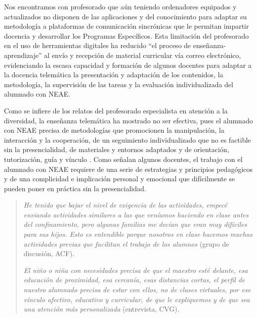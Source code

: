 \documentclass{textolivre}
\begin{document}
Nos encontramos con profesorado que aún teniendo ordenadores equipados y actualizados no disponen de las aplicaciones y del conocimiento para adaptar su metodología a plataformas de comunicación sincrónicas que le permitan impartir docencia y desarrollar los Programas Específicos. Esta limitación del profesorado en el uso de herramientas digitales ha reducido “el proceso de enseñanza-aprendizaje” al envío y recepción de material curricular vía correo electrónico, evidenciando la escasa capacidad y formación de algunos docentes para adaptar a la docencia telemática la presentación y adaptación de los contenidos, la metodología, la supervisión de las tareas y la evaluación individualizada del alumnado con NEAE.

Como se infiere de los relatos del profesorado especialista en atención a la diversidad, la enseñanza telemática ha mostrado no ser efectiva, pues el alumnado con NEAE precisa de metodologías que promocionen la manipulación, la interacción y la cooperación, de un seguimiento individualizado que no es factible sin la presencialidad, de materiales y entornos adaptados \cite{rogero2020} %
y de orientación, tutorización, guía y vínculo \cite{munoz2020}. %
Como señalan algunos docentes, el trabajo con el alumnado con NEAE requiere de una serie de estrategias y principios pedagógicos y de una complicidad e implicación personal y emocional que difícilmente se pueden poner en práctica sin la presencialidad.

\begin{quote}
\emph{He tenido que bajar el nivel de exigencia de las actividades, empecé enviando actividades similares a las que veníamos haciendo en clase antes del confinamiento, pero algunas familias me decían que eran muy difíciles para sus hijos. Esto es entendible porque nosotros en clase hacemos muchas actividades previas que facilitan el trabajo de los alumnos} (grupo de discusión, ACF).

\emph{El niño o niña con necesidades precisa de que el maestro esté delante, esa educación de proximidad, esa cercanía, esas distancias cortas, el perfil de nuestro alumnado precisa de estar con ellos, no de clases virtuales, por ese vínculo afectivo, educativo y curricular, de que le expliquemos y de que sea una atención más personalizada} (entrevista, CVG).
\end{quote}
\end{document}
